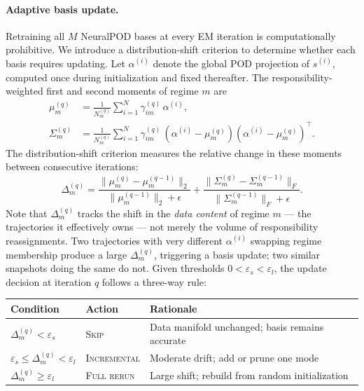 \documentclass{article}
\begin{document}
\paragraph{Adaptive basis update.}
Retraining all $M$ NeuralPOD bases at every EM iteration is
computationally prohibitive.
We introduce a distribution-shift criterion to determine whether each
basis requires updating.
Let $\alpha^{(i)}$ denote the global POD projection of $s^{(i)}$,
computed once during initialization and fixed thereafter.
The responsibility-weighted first and second moments of regime $m$ are
\begin{align}
  \mu_m^{(q)}
  &= \frac{1}{N_m^{(q)}}\sum_{i=1}^N
    \gamma_{im}^{(q)}\,\alpha^{(i)},
  \label{eq:mu}\\
  \Sigma_m^{(q)}
  &= \frac{1}{N_m^{(q)}}\sum_{i=1}^N
    \gamma_{im}^{(q)}\,
    (\alpha^{(i)}-\mu_m^{(q)})(\alpha^{(i)}-\mu_m^{(q)})^\top.
  \label{eq:Sigma}
\end{align}
The distribution-shift criterion measures the relative change in these
moments between consecutive iterations:
\begin{equation}
  \Delta_m^{(q)}
  = \frac{\|\mu_m^{(q)} - \mu_m^{(q-1)}\|_2}
         {\|\mu_m^{(q-1)}\|_2 + \epsilon}
  + \frac{\|\Sigma_m^{(q)} - \Sigma_m^{(q-1)}\|_F}
         {\|\Sigma_m^{(q-1)}\|_F + \epsilon}.
  \label{eq:Delta}
\end{equation}
Note that $\Delta_m^{(q)}$ tracks the shift in the \emph{data content}
of regime $m$ — the trajectories it effectively owns — not merely
the volume of responsibility reassignments.
Two trajectories with very different $\alpha^{(i)}$ swapping regime
membership produce a large $\Delta_m^{(q)}$, triggering a basis
update; two similar snapshots doing the same do not.
Given thresholds $0 < \varepsilon_s < \varepsilon_l$, the update
decision at iteration $q$ follows a three-way rule:

\begin{center}
\renewcommand{\arraystretch}{1.3}\small
\begin{tabular}{lll}
\toprule
Condition & Action & Rationale \\
\midrule
$\Delta_m^{(q)} < \varepsilon_s$
  & \textsc{Skip}
  & Data manifold unchanged; basis remains accurate \\
$\varepsilon_s \le \Delta_m^{(q)} < \varepsilon_l$
  & \textsc{Incremental}
  & Moderate drift; add or prune one mode \\
$\Delta_m^{(q)} \ge \varepsilon_l$
  & \textsc{Full rerun}
  & Large shift; rebuild from random initialization \\
\bottomrule
\end{tabular}
\end{center}
\end{document}
